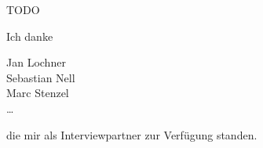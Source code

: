 \documentclass[11pt,a4paper]{article}
\begin{document}
TODO

Ich danke 

Jan Lochner\\
Sebastian Nell\\
Marc Stenzel\\
…

die mir als Interviewpartner zur Verfügung standen.

\pagebreak



\pagebreak

\tableofcontents

\pagebreak









\pagebreak


\end{document}

